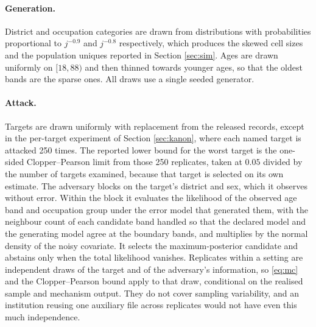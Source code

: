 \documentclass[11pt,a4paper]{article}
\theoremstyle{plain}
\theoremstyle{definition}
\begin{document}
\paragraph{Generation.} District and occupation categories are drawn from
distributions with probabilities proportional to $j^{-0.9}$ and $j^{-0.8}$
respectively, which produces the skewed cell sizes and the population uniques
reported in Section \ref{sec:sim}. Ages are drawn uniformly on $[18, 88)$ and
then thinned towards younger ages, so that the oldest bands are the sparse ones.
All draws use a single seeded generator.

\paragraph{Attack.} Targets are drawn uniformly with replacement from the
released records, except in the per-target experiment of Section
\ref{sec:kanon}, where each named target is attacked 250 times. The reported
lower bound for the worst target is the one-sided Clopper--Pearson limit from
those 250 replicates, taken at $0.05$ divided by the number of targets examined,
because that target is selected on its own estimate.
The adversary blocks on the target's district and sex, which it observes without
error. Within the block it evaluates the likelihood of the observed age band and
occupation group under the error model that generated them, with the neighbour
count of each candidate band handled so that the declared model and the
generating model agree at the boundary bands, and multiplies by the normal
density of the noisy covariate. It selects the maximum-posterior candidate and
abstains only when the total likelihood vanishes. Replicates within a setting
are independent draws of the target and of the adversary's information, so
\eqref{eq:mc} and the Clopper--Pearson bound apply to that draw, conditional on
the realised sample and mechanism output. They do not cover sampling
variability, and an institution reusing one auxiliary file across replicates
would not have even this much independence.
\end{document}
